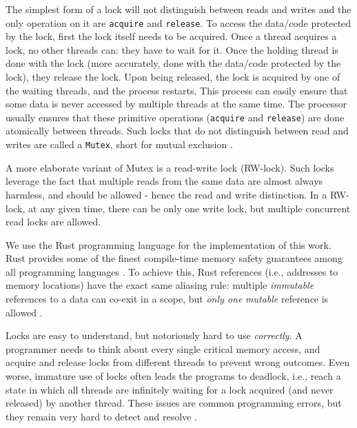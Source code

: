 The simplest form of a lock will not distinguish between reads and writes and the only operation on
it are \texttt{acquire} and \texttt{release}. To access the data/code protected by the lock, first
the lock itself needs to be acquired. Once a thread acquires a lock, no other threads can: they have
to wait for it. Once the holding thread is done with the lock (more accurately, done with the
data/code protected by the lock), they release the lock. Upon being released, the lock is acquired
by one of the waiting threads, and the process restarts. This process can easily ensure that some
data is never accessed by multiple threads at the same time. The processor usually ensures that
these primitive operations (\texttt{acquire} and \texttt{release}) are done atomically between
threads. Such locks that do not distinguish between read and writes are called a \texttt{Mutex},
short for mutual exclusion \cite{guerraouiLockUnlockThat2019}.

A more elaborate variant of Mutex is a read-write lock (RW-lock). Such locks leverage the fact that
multiple reads from the same data are almost always harmless, and should be allowed - hence the read
and write distinction. In a RW-lock, at any given time, there can be only one write lock, but
multiple concurrent read locks are allowed.

\begin{remark}
	We use the Rust programming language for the implementation of this work. Rust provides some of
	the finest compile-time memory safety guarantees among all programming languages
	\cite{jungRustBeltSecuringFoundations2017}. To achieve this, Rust references (i.e., addresses to
	memory locations) have the exact same aliasing rule: multiple \textit{immutable} references to a
	data can co-exit in a scope, but \textit{only one} \textit{mutable} reference is allowed
	\cite{weissOxideEssenceRust2020}.
\end{remark}

Locks are easy to understand, but notoriously hard to use \textit{correctly}. A programmer needs to
think about every single critical memory access, and acquire and release locks from different
threads to prevent wrong outcomes. Even worse, immature use of locks often leads the programs to
deadlock, i.e., reach a  state in which all threads are infinitely waiting for a lock acquired (and
never released) by another thread. These issues are common programming errors, but they remain very
hard to detect and resolve \cite{herlihyArtMultiprocessorProgramming2012}.

